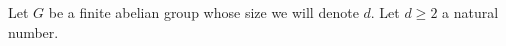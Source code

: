 
Let $G$ be a finite abelian group whose size we will denote $d$. Let $d \ge 2$ a natural number.





